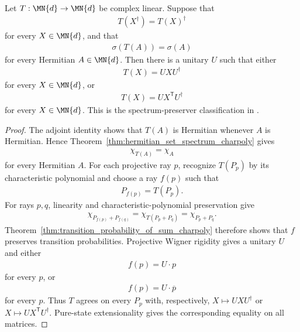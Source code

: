 \begin{theorem}
    \label{thm:hermitian_spectrum_preserver_classification}
    \leanok
    Let $T:\MN{d}\to\MN{d}$ be complex linear. Suppose that
    \begin{align}
        T(X^\dagger)=T(X)^\dagger
    \end{align}
    for every $X\in\MN{d}$, and that
    \begin{align}
        \sigma(T(A))=\sigma(A)
    \end{align}
    for every Hermitian $A\in\MN{d}$. Then there is a unitary $U$ such that
    either
    \begin{align}
        T(X)=UXU^\dagger
    \end{align}
    for every $X\in\MN{d}$, or
    \begin{align}
        T(X)=UX^{\mathsf T}U^\dagger
    \end{align}
    for every $X\in\MN{d}$. This is the spectrum-preserver classification
    in \cite[Chapter~1, Spectrum preserving maps]{Wolf2012Quantum}.
\end{theorem}

\begin{proof}\leanok
    The adjoint identity shows that $T(A)$ is Hermitian whenever $A$ is
    Hermitian. Hence Theorem~\ref{thm:hermitian_set_spectrum_charpoly} gives
    \begin{align}
        \chi_{T(A)}=\chi_A
    \end{align}
    for every Hermitian $A$. For each projective ray $p$, recognize
    $T(P_p)$ by its characteristic polynomial and choose a ray $f(p)$ such
    that
    \begin{align}
        P_{f(p)}=T(P_p).
    \end{align}
    For rays $p,q$, linearity and characteristic-polynomial preservation give
    \begin{align}
        \chi_{P_{f(p)}+P_{f(q)}}
        =\chi_{T(P_p+P_q)}
        =\chi_{P_p+P_q}.
    \end{align}
    Theorem~\ref{thm:transition_probability_of_sum_charpoly} therefore shows
    that $f$ preserves transition probabilities. Projective Wigner rigidity
    gives a unitary $U$ and either
    \begin{align}
        f(p)=U\cdot p
    \end{align}
    for every $p$, or
    \begin{align}
        f(p)=U\cdot\overline p
    \end{align}
    for every $p$. Thus $T$ agrees on every $P_p$ with, respectively,
    $X\mapsto UXU^\dagger$ or $X\mapsto UX^{\mathsf T}U^\dagger$.
    Pure-state extensionality gives the corresponding equality on all
    matrices.
\end{proof}
